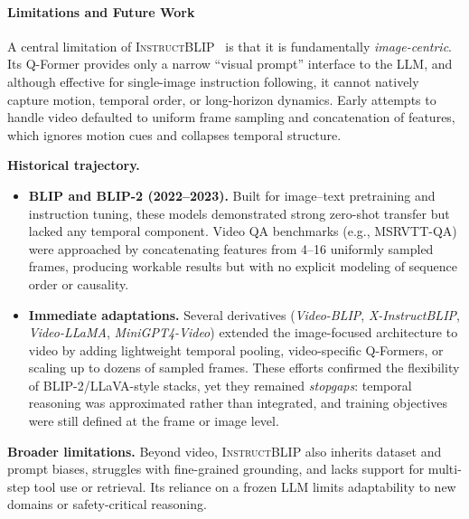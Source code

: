 \begin{enrichment}
\begin{enrichment}
        \paragraph{Limitations and Future Work}
        A central limitation of \textsc{InstructBLIP}~\cite{dai2023_instructblip} is that it is fundamentally \emph{image-centric}. Its Q-Former provides only a narrow ``visual prompt'' interface to the LLM, and although effective for single-image instruction following, it cannot natively capture motion, temporal order, or long-horizon dynamics. Early attempts to handle video defaulted to uniform frame sampling and concatenation of features, which ignores motion cues and collapses temporal structure.
        
        \medskip
        \noindent\textbf{Historical trajectory.}
        \begin{itemize}
            \item \textbf{BLIP and BLIP-2 (2022--2023).} Built for image--text pretraining and instruction tuning, these models demonstrated strong zero-shot transfer but lacked any temporal component. Video QA benchmarks (e.g., MSRVTT-QA) were approached by concatenating features from 4--16 uniformly sampled frames, producing workable results but with no explicit modeling of sequence order or causality.
            \item \textbf{Immediate adaptations.} Several derivatives (\emph{Video-BLIP}, \emph{X-InstructBLIP}, \emph{Video-LLaMA}, \emph{MiniGPT4-Video}) extended the image-focused architecture to video by adding lightweight temporal pooling, video-specific Q-Formers, or scaling up to dozens of sampled frames. These efforts confirmed the flexibility of BLIP-2/LLaVA-style stacks, yet they remained \emph{stopgaps}: temporal reasoning was approximated rather than integrated, and training objectives were still defined at the frame or image level.
        \end{itemize}
        
        \medskip
        \noindent\textbf{Broader limitations.}
        Beyond video, \textsc{InstructBLIP} also inherits dataset and prompt biases, struggles with fine-grained grounding, and lacks support for multi-step tool use or retrieval. Its reliance on a frozen LLM limits adaptability to new domains or safety-critical reasoning.
        
        \newpage
        

\end{enrichment}
\end{enrichment}
